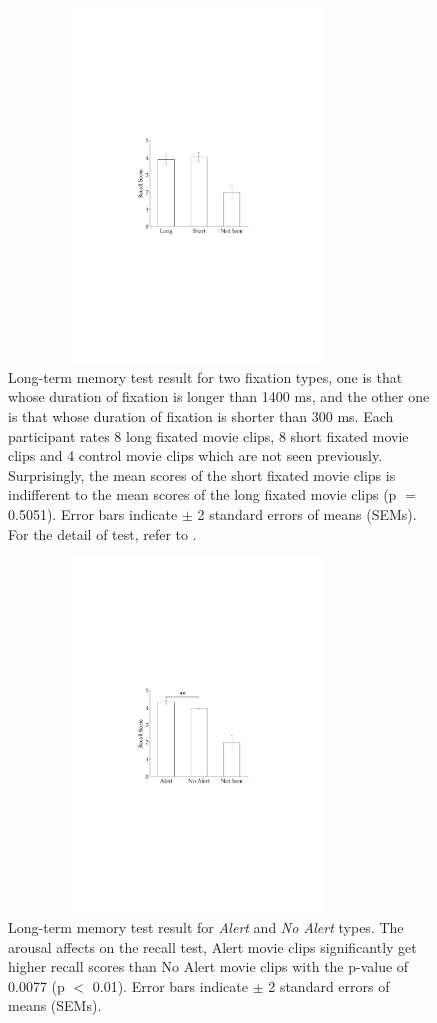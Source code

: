 \documentclass[oneside,master]{snueethesis}
\begin{document}
\begin{figure}
  \centerline{\includegraphics[width=100mm,height=94mm,trim=48mm 100mm 52mm 95mm]{./eps/memtest_leng}}
  \caption[Long-term memory test result for two fixation duration types]{Long-term memory test result for two fixation types, one is that whose duration of fixation is longer than 1400 ms, and the other one is that whose duration of fixation is shorter than 300 ms. Each participant rates 8 long fixated movie clips, 8 short fixated movie clips and 4 control movie clips which are not seen previously. Surprisingly, the mean scores of the short fixated movie clips is indifferent to the mean scores of the long fixated movie clips (p $=$ 0.5051). Error bars indicate $\pm$ 2 standard errors of means (SEMs). For the detail of test, refer to \textit{}.}
  \label{fig:memtest-leng}
\end{figure}

\begin{figure}
  \centerline{\includegraphics[width=100mm,height=94mm,trim=48mm 100mm 52mm 95mm]{./eps/memtest_alert}}
  \caption[Long-term memory test result for Alert and No Alert types]{Long-term memory test result for \textit{Alert} and \textit{No Alert} types. The arousal affects on the recall test, Alert movie clips significantly get higher recall scores than No Alert movie clips with the p-value of 0.0077 (p $<$ 0.01). Error bars indicate $\pm$ 2 standard errors of means (SEMs).}
  \label{fig:memtest-alert}
\end{figure}
\end{document}
